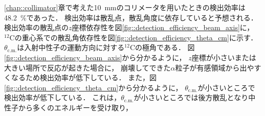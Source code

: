 \documentclass[../master]{subfiles}
\begin{document}
%
\ref{chap::collimator}章で考えた\SI{10}{\milli\metre}のコリメータを用いたときの検出効率は\SI{48.2}{\percent}であった．
検出効率は散乱点，散乱角度に依存していると予想される．
検出効率の散乱点の$z$座標依存性を図\ref{fig::detection_efficiency_beam_axis}に，
${}^{12}\mathrm{C}$の重心系での散乱角依存性を図\ref{fig::detection_efficiency_theta_cm}に示す．
$\theta_{\text{c.m.}}$は入射中性子の運動方向に対する${}^{12}\mathrm{C}$の極角である．
図\ref{fig::detection_efficiency_beam_axis}から分かるように，
$z$座標が小さいまたは大きい場所で反応が起きた場合に，
崩壊してできた$\alpha$粒子が有感領域から出やすくなるため検出効率が低下している．
また，図\ref{fig::detection_efficiency_theta_cm}から分かるように，
$\theta_{\text{c.m.}}$が小さいところで検出効率が低下している．
これは，$\theta_{\text{c.m.}}$が小さいところでは後方散乱となり中性子から多くのエネルギーを受け取り，
\end{document}
